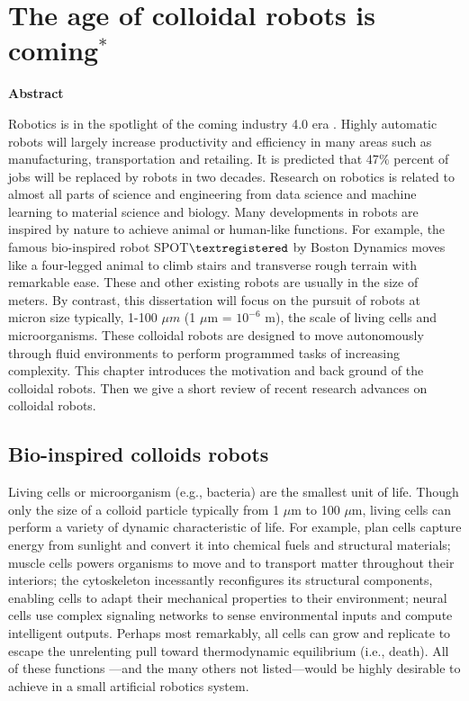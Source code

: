 \chapter{The age of colloidal robots is coming$^{*}$}
\begin{center}
\vspace*{1\baselineskip}
\textbf{Abstract}
\end{center}
Robotics is in the spotlight of the coming industry 4.0 era \autocite{lasi2014industry}. Highly automatic robots will largely increase productivity and efficiency in many areas such as manufacturing, transportation and retailing. 
It is predicted that 47$\%$ percent of jobs will be replaced by robots in two decades\autocite{frey2017future}.
Research on robotics is related to almost all parts of science and engineering from data science and machine learning to material science and biology. Many developments in robots are inspired by nature to achieve animal or human-like functions. For example,  the famous  bio-inspired robot SPOT$\textregistered$  by Boston Dynamics \autocite{yang2019ten} moves like a four-legged animal to climb stairs and transverse rough terrain with remarkable ease. These and other existing robots are usually in the size of meters. By contrast, this dissertation will focus on the pursuit of robots at micron size typically, 1-100 $\mu m$ (1 $\mu$m = $10^{-6}$ m), the scale of living cells and microorganisms. These colloidal robots are designed to move autonomously through fluid environments to perform programmed tasks of increasing complexity. This chapter introduces the motivation and back ground of the colloidal robots. Then we give a short review of recent research advances on colloidal robots.

\section{Bio-inspired colloids robots}
Living cells or microorganism (e.g., bacteria) are the smallest unit of life. Though  only the size of a colloid particle typically from 1 $\mu$m to 100 $\mu$m, living cells can perform  a variety of dynamic characteristic of life. For example, plan cells capture energy from sunlight and convert it into chemical fuels and structural materials; muscle cells powers organisms to move and to transport matter throughout their interiors; the cytoskeleton incessantly reconfigures its structural components, enabling cells to adapt their mechanical properties to their environment; neural cells use complex signaling networks to sense environmental inputs and compute intelligent outputs. Perhaps most remarkably, all cells can grow and replicate to escape the unrelenting pull toward thermodynamic equilibrium (i.e., death).  All of these functions ---and the many others not listed---would be highly desirable to achieve in a small artificial robotics system. 

